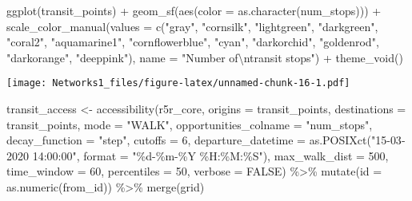 \documentclass[
]{article}
\newenvironment{Shaded}{\begin{snugshade}}{\end{snugshade}}
\newcommand{\AttributeTok}[1]{\textcolor[rgb]{0.77,0.63,0.00}{#1}}
\newcommand{\ConstantTok}[1]{\textcolor[rgb]{0.00,0.00,0.00}{#1}}
\newcommand{\DecValTok}[1]{\textcolor[rgb]{0.00,0.00,0.81}{#1}}
\newcommand{\FunctionTok}[1]{\textcolor[rgb]{0.00,0.00,0.00}{#1}}
\newcommand{\NormalTok}[1]{#1}
\newcommand{\OtherTok}[1]{\textcolor[rgb]{0.56,0.35,0.01}{#1}}
\newcommand{\SpecialCharTok}[1]{\textcolor[rgb]{0.00,0.00,0.00}{#1}}
\newcommand{\StringTok}[1]{\textcolor[rgb]{0.31,0.60,0.02}{#1}}
\begin{document}
\begin{Shaded}
\begin{Highlighting}[]
\FunctionTok{ggplot}\NormalTok{(transit\_points) }\SpecialCharTok{+}
  \FunctionTok{geom\_sf}\NormalTok{(}\FunctionTok{aes}\NormalTok{(}\AttributeTok{color =} \FunctionTok{as.character}\NormalTok{(num\_stops))) }\SpecialCharTok{+}
  \FunctionTok{scale\_color\_manual}\NormalTok{(}\AttributeTok{values =} \FunctionTok{c}\NormalTok{(}\StringTok{"gray"}\NormalTok{, }\StringTok{"cornsilk"}\NormalTok{, }\StringTok{"lightgreen"}\NormalTok{, }\StringTok{"darkgreen"}\NormalTok{, }\StringTok{"coral2"}\NormalTok{, }\StringTok{"aquamarine1"}\NormalTok{, }\StringTok{"cornflowerblue"}\NormalTok{, }\StringTok{"cyan"}\NormalTok{, }\StringTok{"darkorchid"}\NormalTok{, }\StringTok{"goldenrod"}\NormalTok{, }\StringTok{"darkorange"}\NormalTok{, }\StringTok{"deeppink"}\NormalTok{), }
                    \AttributeTok{name =} \StringTok{"Number of}\SpecialCharTok{\textbackslash{}n}\StringTok{transit stops"}\NormalTok{) }\SpecialCharTok{+}
  \FunctionTok{theme\_void}\NormalTok{()}
\end{Highlighting}
\end{Shaded}

\texttt{[image: Networks1\_files/figure-latex/unnamed-chunk-16-1.pdf]}

\begin{Shaded}
\begin{Highlighting}[]
\NormalTok{transit\_access }\OtherTok{\textless{}{-}} \FunctionTok{accessibility}\NormalTok{(r5r\_core,}
                        \AttributeTok{origins =}\NormalTok{ transit\_points,}
                        \AttributeTok{destinations =}\NormalTok{ transit\_points,}
                        \AttributeTok{mode =} \StringTok{"WALK"}\NormalTok{,}
                        \AttributeTok{opportunities\_colname =} \StringTok{"num\_stops"}\NormalTok{,}
                        \AttributeTok{decay\_function =} \StringTok{"step"}\NormalTok{,}
                        \AttributeTok{cutoffs =} \DecValTok{6}\NormalTok{,}
                        \AttributeTok{departure\_datetime =} \FunctionTok{as.POSIXct}\NormalTok{(}\StringTok{"15{-}03{-}2020 14:00:00"}\NormalTok{,}
                                 \AttributeTok{format =} \StringTok{"\%d{-}\%m{-}\%Y \%H:\%M:\%S"}\NormalTok{),}
                        \AttributeTok{max\_walk\_dist =} \DecValTok{500}\NormalTok{,}
                        \AttributeTok{time\_window =} \DecValTok{60}\NormalTok{,}
                        \AttributeTok{percentiles =} \DecValTok{50}\NormalTok{,}
                        \AttributeTok{verbose =} \ConstantTok{FALSE}\NormalTok{) }\SpecialCharTok{\%\textgreater{}\%}
  \FunctionTok{mutate}\NormalTok{(}\AttributeTok{id =} \FunctionTok{as.numeric}\NormalTok{(from\_id)) }\SpecialCharTok{\%\textgreater{}\%}
  \FunctionTok{merge}\NormalTok{(grid)}
\end{Highlighting}
\end{Shaded}
\end{document}
